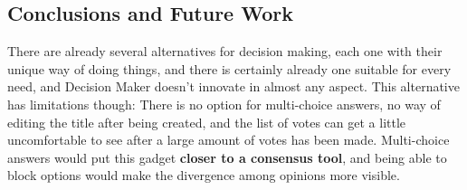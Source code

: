 \subsection{Conclusions and Future Work}
There are already several alternatives for decision making, each one with their unique way of doing things, and there is certainly already one suitable for every need, and Decision Maker doesn't innovate in almost any aspect. This alternative has limitations though: There is no option for multi-choice answers, no way of editing the title after being created, and the list of votes can get a little uncomfortable to see after a large amount of votes has been made. Multi-choice answers would put this gadget \textbf{closer to a consensus tool}, and being able to block options would make the divergence among opinions more visible.
\newpage
